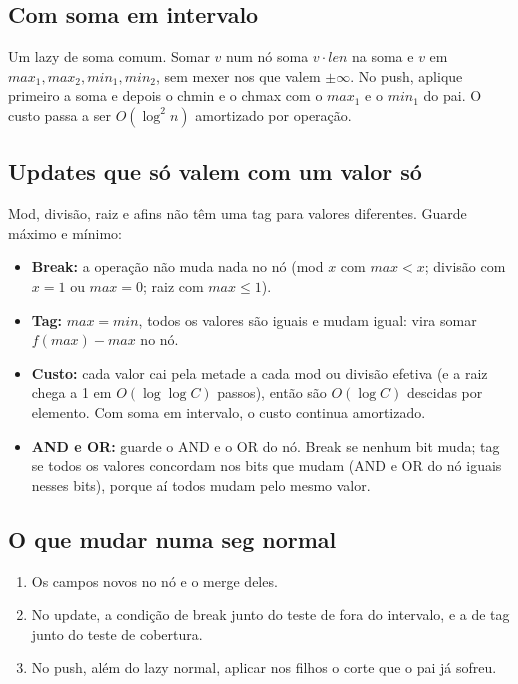 \subsection*{Com soma em intervalo}

Um lazy de soma comum. Somar $v$ num nó soma $v \cdot len$ na soma e $v$ em $max_1, max_2, min_1, min_2$, sem mexer nos
que valem $\pm\infty$. No push, aplique primeiro a soma e depois o chmin e o chmax com o $max_1$ e o $min_1$ do pai.
O custo passa a ser $O(\log^2 n)$ amortizado por operação.

\subsection*{Updates que só valem com um valor só}

Mod, divisão, raiz e afins não têm uma tag para valores diferentes. Guarde máximo e mínimo:
\begin{itemize}
  \item \textbf{Break:} a operação não muda nada no nó (mod $x$ com $max < x$; divisão com $x = 1$ ou $max = 0$; raiz com $max \le 1$).
  \item \textbf{Tag:} $max = min$, todos os valores são iguais e mudam igual: vira somar $f(max) - max$ no nó.
  \item \textbf{Custo:} cada valor cai pela metade a cada mod ou divisão efetiva (e a raiz chega a 1 em $O(\log \log C)$
        passos), então são $O(\log C)$ descidas por elemento. Com soma em intervalo, o custo continua amortizado.
  \item \textbf{AND e OR:} guarde o AND e o OR do nó. Break se nenhum bit muda; tag se todos os valores concordam nos
        bits que mudam (AND e OR do nó iguais nesses bits), porque aí todos mudam pelo mesmo valor.
\end{itemize}

\subsection*{O que mudar numa seg normal}

\begin{enumerate}
  \item Os campos novos no nó e o merge deles.
  \item No update, a condição de break junto do teste de fora do intervalo, e a de tag junto do teste de cobertura.
  \item No push, além do lazy normal, aplicar nos filhos o corte que o pai já sofreu.
\end{enumerate}
